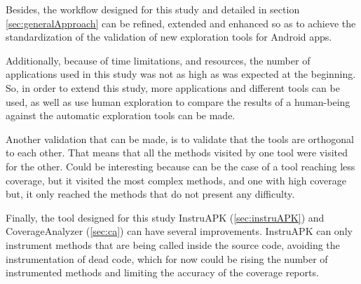 Besides, the workflow designed for this study and detailed in section \ref{sec:generalApproach} can be refined, extended and enhanced so as to achieve the standardization of the validation of new exploration tools for Android apps. 

Additionally, because of time limitations, and resources, the number of applications used in this study was not as high as was expected at the beginning. So, in order to extend this study, more applications and different tools can be used, as well as use human exploration to compare the results of a human-being against the automatic exploration tools can be made.

Another validation that can be made, is to validate that the tools are orthogonal to each other. That means that all the methods visited by one tool were visited for the other. Could be interesting because can be the case of a tool reaching less coverage, but it visited the most complex methods, and one with high coverage but, it only reached the methods that do not present any difficulty. 

Finally, the tool designed for this study InstruAPK (\ref{sec:instruAPK}) and CoverageAnalyzer (\ref{sec:ca}) can have several improvements. InstruAPK can only instrument methods that are being called inside the source code, avoiding the instrumentation of dead code, which for now could be rising the number of instrumented methods and limiting the accuracy of the coverage reports.
